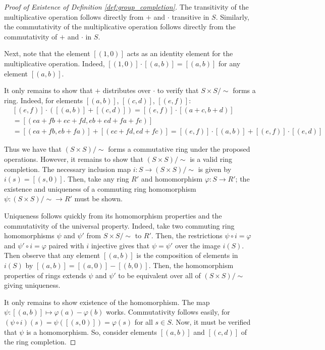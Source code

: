 \documentclass[../../sean_thesis.tex]{subfiles}
\begin{document}
\begin{proof}[Proof of Existence of Definition \ref{def:group_completion}]
The transitivity of the multiplicative operation follows directly from $+$ and $\cdot$ transitive in $S$. Similarly, the commutativity of the multiplicative operation follows directly from the commutativity of $+$ and $\cdot$ in $S$.

Next, note that the element $[(1,0)]$ acts as an identity element for the multiplicative operation. Indeed, $[(1,0)]\cdot[(a,b)] = [(a,b)]$ for any element $[(a,b)]$.

It only remains to show that $+$ distributes over $\cdot$ to verify that $S\times S/\sim$ forms a ring. Indeed, for elements $[(a,b)]$, $[(c,d)]$, $[(e,f)]$:
\begin{align*}
	&[(e,f)] \cdot ([(a,b)]+[(c,d)]) 
	= [(e,f)] \cdot [(a+c,b+d)]\\
	&= [(ea+fb+ec+fd, eb+ed+fa+fe)]\\
	&= [(ea+fb,eb+fa)] + [(ec+fd,ed+fc)] 
	= [(e,f)]\cdot[(a,b)]+[(e,f)]\cdot[(e,d)]
\end{align*}

Thus we have that $(S\times S)/\sim$ forms a commutative ring under the proposed operations. However, it remains to show that $(S\times S)/\sim$ is a valid ring completion. The necessary inclusion map $i: S \to (S\times S)/\sim$ is given by $i(s) = [(s,0)]$. Then, take any ring $R'$ and homomorphism $\varphi: S \to R'$; the existence and uniqueness of a commuting ring homomorphism $\psi: (S \times S)/\sim \to R'$ must be shown.

Uniqueness follows quickly from its homomorphism properties and the commutativity of the universal property. Indeed, take two commuting ring homomorphisms $\psi$ and $\psi'$ from $S\times S/\sim$ to $R'$. Then, the restrictions $\psi \circ i = \varphi$ and $\psi' \circ i = \varphi$ paired with $i$ injective gives that $\psi = \psi'$ over the image $i(S)$. Then observe that any element $[(a,b)]$ is the composition of elements in $i(S)$ by $[(a,b)] = [(a,0)]-[(b,0)]$. Then, the homomorphism properties of rings extends $\psi$ and $\psi'$ to be equivalent over all of $(S\times S)/\sim$ giving uniqueness.
	
It only remains to show existence of the homomorphism. The map $\psi: [(a,b)] \mapsto \varphi(a)-\varphi(b)$ works. Commutativity follows easily, for $(\psi \circ i)(s) = \psi([(s,0)]) = \varphi(s)$ for all $s \in S$. Now, it must be verified that $\psi$ is a homomorphism. So, consider elements $[(a,b)]$ and $[(c,d)]$ of the ring completion.


\end{proof}
\end{document}
